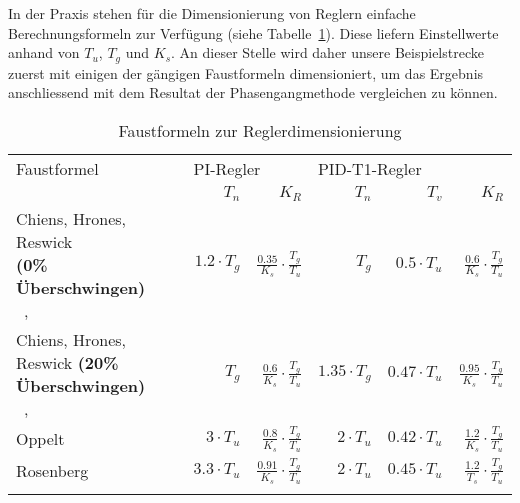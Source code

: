 In  der  Praxis   stehen  f\"ur  die  Dimensionierung   von  Reglern  einfache
Berechnungsformeln  zur  Verf\"ugung  (siehe  Tabelle~\ref{tab:faustformeln}).
Diese  liefern Einstellwerte  anhand  von $T_u$,  $T_g$  und $K_s$. An  dieser
Stelle wird  daher unsere  Beispielstrecke zuerst  mit einigen  der g\"angigen
Faustformeln dimensioniert, um das Ergebnis anschliessend mit dem Resultat der
Phasengangmethode vergleichen zu k\"onnen.

\begin{longtable}{p{50mm}rrrrr}
    \toprule


    Faustformel
    &
    \multicolumn{2}{l}{PI-Regler}
    &
    \multicolumn{2}{l}{PID-T1-Regler}
    \\

    &
    $T_n$
    &
    $K_R$
    &
    $T_n$
    &
    $T_v$
    &
    $K_R$
    \\

    \midrule

    \endhead
    \endfoot
    \endlastfoot


    \pbox{45mm}{Chiens, Hrones, Reswick \\ \small{\textbf{(0\% \"Uberschwingen)}} \\~\cite{ref:chiens_tsn},~\cite{ref:chiens_wiki}}
    &
    $1.2\cdot T_g$
    &
    $\frac{0.35}{K_s} \cdot \frac{T_g}{T_u}$
    &
    $T_g$
    &
    $0.5\cdot T_u$
    &
    $ \frac{0.6}{K_s} \cdot \frac{T_g}{T_u} $
    \\

    \addlinespace[1em]

    \pbox{45mm}{Chiens, Hrones, Reswick \small{\textbf{(20\% \"Uberschwingen)}} \\~\cite{ref:chiens_tsn},~\cite{ref:chiens_wiki}}
    &
    $T_g$
    &
    $\frac{0.6}{K_s} \cdot \frac{T_g}{T_u}$
    &
    $1.35\cdot T_g$
    &
    $0.47 \cdot T_u$
    &
    $ \frac{0.95}{K_s} \cdot \frac{T_g}{T_u} $
    \\

    \addlinespace[1em]

    Oppelt~\cite{ref:op_ros_zieg}
    &
    $3 \cdot T_u$
    &
    $\frac{0.8}{K_s} \cdot \frac{T_g}{T_u}$
    &
    $2 \cdot T_u$
    &
    $ 0.42 \cdot T_u $
    &
    $ \frac{1.2}{K_s} \cdot \frac{T_g}{T_u} $
    \\

    \addlinespace[1em]

    Rosenberg~\cite{ref:op_ros_zieg}
    &
    $3.3 \cdot T_u $
    &
    $ \frac{0.91}{K_s} \cdot \frac{T_g}{T_u} $
    &
    $ 2 \cdot T_u $
    &
    $ 0.45 \cdot T_u $
    &
    $ \frac{1.2}{T_s} \cdot \frac{T_g}{T_u}$
    \\

    \addlinespace[1em]

    \bottomrule
\caption{Faustformeln zur Reglerdimensionierung}
\label{tab:faustformeln}
\end{longtable}

